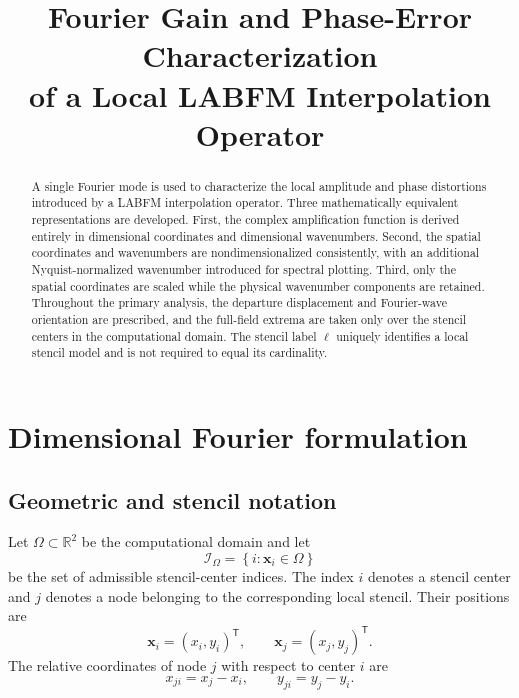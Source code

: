 \documentclass[11pt]{article}
\title{Fourier Gain and Phase-Error Characterization\\
of a Local LABFM Interpolation Operator}
\author{}
\date{}
\numberwithin{equation}{section}
\newcommand{\R}{\mathbb{R}}
\begin{document}
\maketitle

\begin{abstract}
A single Fourier mode is used to characterize the local amplitude and phase distortions introduced by a LABFM interpolation operator. Three mathematically equivalent representations are developed. First, the complex amplification function is derived entirely in dimensional coordinates and dimensional wavenumbers. Second, the spatial coordinates and wavenumbers are nondimensionalized consistently, with an additional Nyquist-normalized wavenumber introduced for spectral plotting. Third, only the spatial coordinates are scaled while the physical wavenumber components are retained. Throughout the primary analysis, the departure displacement and Fourier-wave orientation are prescribed, and the full-field extrema are taken only over the stencil centers in the computational domain. The stencil label $\ell$ uniquely identifies a local stencil model and is not required to equal its cardinality.
\end{abstract}

\section{Dimensional Fourier formulation}
\label{sec:dimensional}

\subsection{Geometric and stencil notation}

Let $\Omega\subset\R^2$ be the computational domain and let
\begin{equation}
    \mathcal I_{\Omega}
    =
    \left\{i:\bm{x}_i\in\Omega\right\}
    \label{eq:center-index-set}
\end{equation}
be the set of admissible stencil-center indices. The index $i$ denotes a stencil center and $j$ denotes a node belonging to the corresponding local stencil. Their positions are
\begin{equation}
    \bm{x}_i=(x_i,y_i)^{\mathsf T},
    \qquad
    \bm{x}_j=(x_j,y_j)^{\mathsf T}.
    \label{eq:center-node-coordinates}
\end{equation}
The relative coordinates of node $j$ with respect to center $i$ are
\begin{equation}
    x_{ji}=x_j-x_i,
    \qquad
    y_{ji}=y_j-y_i.
    \label{eq:relative-node-coordinates}
\end{equation}
\end{document}
